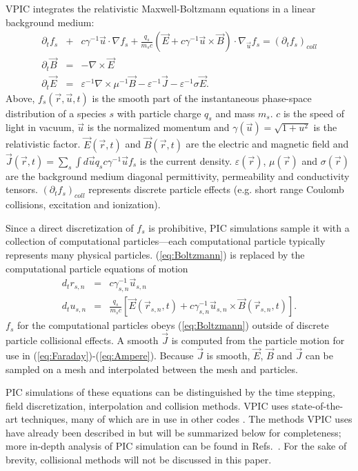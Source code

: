 \documentclass[letter,10pt]{article}
\newcommand{\eps}{\varepsilon}
\newcommand{\vecr}{\vec{r}}
\newcommand{\vecu}{\vec{u}}
\newcommand{\vecJ}{\vec{J}}
\newcommand{\vecE}{\vec{E}}
\newcommand{\vecB}{\vec{B}}
\newcommand{\Deriv}[2]{d_{#2}#1}
\newcommand{\PDeriv}[2]{\partial_{#2}#1}
\newcommand{\DotP}[2]{#1 \cdot #2}
\newcommand{\CrossP}[2]{#1 \times #2}
\newcommand{\Grad}[1]{\nabla #1}
\newcommand{\Curl}[1]{\nabla \times #1}
\newcommand{\Gradu}[1]{\nabla_{\vecu} #1}
\newcommand{\eq}[1]{(\ref{eq:#1})}
\begin{document}
VPIC integrates the relativistic Maxwell-Boltzmann equations in a
linear background medium:
\begin{eqnarray}
\PDeriv{f_s}{t} &+& 
\DotP{c\gamma^{-1}\vecu}{\Grad{f_s}} +
\DotP{\frac{q_s}{m_s c}\left(\vecE+\CrossP{c\gamma^{-1}\vecu}{\vecB}\right)}
{\Gradu{f_s}} = \left(\PDeriv{f_s}{t}\right)_{coll} \label{eq:Boltzmann}\\
\PDeriv{\vecB}{t} &=& -\Curl{\vecE} \label{eq:Faraday}\\
\PDeriv{\vecE}{t} &=&
\eps^{-1}\Curl{\mu^{-1}\vecB} - \eps^{-1}\vecJ - \eps^{-1}\sigma\vecE
\label{eq:Ampere}
.
\end{eqnarray}
Above, $f_s\left(\vecr,\vecu,t\right)$ is the smooth part of the
instantaneous phase-space distribution of a species $s$ with particle
charge $q_s$ and mass $m_s$.  $c$ is the speed of light in vacuum,
$\vecu$ is the normalized momentum and $\gamma\left(\vecu\right) =
\sqrt{1 + u^2}$ is the relativistic factor.
$\vecE\left(\vecr,t\right)$ and $\vecB\left(\vecr,t\right)$ are the
electric and magnetic field and $\vecJ\left(\vecr,t\right) =
\sum_s \int d\vecu q_s c\gamma^{-1}\vecu f_s$ is the current
density.  $\eps\left(\vecr\right)$, $\mu\left(\vecr\right)$ and
$\sigma\left(\vecr\right)$ are the background medium diagonal
permittivity, permeability and conductivity tensors.
$\left(\PDeriv{f_s}{t}\right)_{coll}$ represents discrete
particle effects (e.g. short range Coulomb collisions, excitation and
ionization).

Since a direct discretization of $f_s$ is prohibitive, PIC simulations
sample it with a collection of computational particles---each
computational particle typically represents many physical particles.
\eq{Boltzmann} is replaced by the computational particle
equations of motion
\begin{eqnarray}
\Deriv{r_{s,n}}{t} &=& c \gamma_{s,n}^{-1} \vecu_{s,n} \label{eq:Position}\\
\Deriv{u_{s,n}}{t} &=& \frac{q_s}{m_s c} \left[
\vecE\left(\vecr_{s,n},t\right) +
\CrossP{c\gamma_{s,n}^{-1}\vecu_{s,n}}{\vecB\left(\vecr_{s,n},t\right)}
\right] \label{eq:Momentum}
.
\end{eqnarray}
$f_s$ for the computational particles obeys \eq{Boltzmann} outside of
discrete particle collisional effects.  A smooth $\vecJ$ is computed
from the particle motion for use in \eq{Faraday}-\eq{Ampere}.  Because
$\vecJ$ is smooth, $\vecE$, $\vecB$ and $\vecJ$ can be sampled on a
mesh and interpolated between the mesh and particles.

PIC simulations of these equations can be distinguished by the time
stepping, field discretization, interpolation and collision methods.
VPIC uses state-of-the-art techniques, many of which are in use in
other codes
\cite{Kwan_Snell_1985,Verboncoeur_et_al_1995,Eastwood_et_al_1995,Jones_et_al_1996,Blahovec_et_al_2000,Nieter_Cary_2004}.
The methods VPIC uses have already been described in
\cite{Bowers_et_al_2007} but will be summarized below for
completeness; more in-depth analysis of PIC simulation can be found in
Refs.~\cite{Birdsall_Langdon_1985,Hockney_Eastwood_1988}.  For the
sake of brevity, collisional methods will not be discussed in this
paper.
\end{document}
